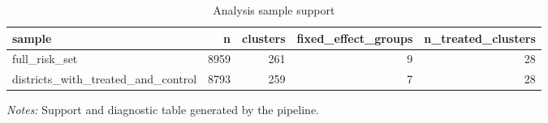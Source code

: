 \begin{table}[!htbp] \centering
\caption{Analysis sample support}
\begin{tabular}{lrrrr}
\toprule
sample & n & clusters & fixed\_effect\_groups & n\_treated\_clusters \\
\midrule
full\_risk\_set & 8959 & 261 & 9 & 28 \\
districts\_with\_treated\_and\_control & 8793 & 259 & 7 & 28 \\
\bottomrule
\end{tabular}

\begin{minipage}{0.98\textwidth}
\footnotesize \textit{Notes:} Support and diagnostic table generated by the pipeline.
\end{minipage}
\end{table}
